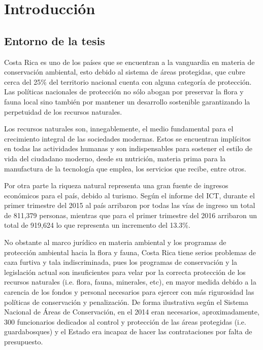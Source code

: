 \chapter{Introducción}
\label{chp:intro}
\section{Entorno de la tesis}

Costa Rica es uno de los países que se encuentran a la vanguardia en materia de conservación ambiental, esto debido al sistema de áreas protegidas, que cubre cerca del 25\% del territorio nacional cuenta con alguna categoría de protección. Las políticas nacionales de protección no sólo abogan por preservar la flora y fauna local sino también por mantener un desarrollo sostenible garantizando la perpetuidad de los recursos naturales. \cite{website:sinac}

Los recursos naturales son, innegablemente, el medio fundamental para el crecimiento integral de las sociedades modernas. Estos se encuentran implícitos en todas las actividades humanas y son indispensables para sostener el estilo de vida del ciudadano moderno, desde su nutrición, materia prima para la manufactura de la tecnología que emplea, los servicios que recibe, entre otros. \cite{website:inbio}

Por otra parte la riqueza natural representa una gran fuente de ingresos económicos para el país, debido al turismo. Según el informe del ICT, durante el primer trimestre del 2015 al país arribaron por todas las vías de ingreso un total de 811,379 personas, mientras que para el primer trimestre del 2016 arribaron un total de 919,624 lo que representa un incremento del 13.3\%. \cite{website:ict}

No obstante al marco jurídico en materia ambiental y los programas de protección ambiental hacia la flora y fauna, Costa Rica tiene serios problemas de caza furtiva y tala indiscriminada, pues los programas de conservación y la legislación actual son insuficientes para velar por la correcta protección de los recursos naturales (i.e. flora, fauna, minerales, etc), en mayor medida debido a la carencia de los fondos y personal necesarios para ejercer con más rigurosidad las políticas de conservación y penalización. De forma ilustrativa según el Sistema Nacional de Áreas de Conservación, en el 2014 eran necesarios, aproximadamente, 300 funcionarios dedicados al control y protección de las áreas protegidas (i.e. guardabosques) y el Estado era incapaz de hacer las contrataciones por falta de presupuesto. \cite{website:sinac}

